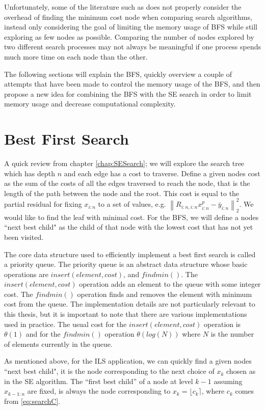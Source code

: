 \documentclass[12pt,Bold,letterpaper]{mcgilletdclass}
\begin{document}
Unfortunately, some of the literature such as \cite{StuBF07} does not properly consider the overhead of finding the minimum cost node when comparing search algorithms, instead only considering the goal of limiting the memory usage of BFS while still exploring as few nodes as possible. Comparing the number of nodes explored by two different search processes may not always be meaningful if one process spends much more time on each node than the other.

The following sections will explain the BFS, quickly overview a couple of attempts that have been made to control the memory usage of the BFS, and then propose a new idea for combining the BFS with the SE search in order to limit memory usage and decrease computational complexity.

\section{Best First Search} \label{sec:BFS}

A quick review from chapter \ref{chap:SESearch}; we will explore the search tree which has depth $n$ and each edge has a cost to traverse. Define a given nodes cost as the sum of the costs of all the edges traversed to reach the node, that is the length of the path between the node and the root. This cost is equal to the partial residual for fixing $x_{i:n}$ to a set of values, e.g. $\left \| R_{i:n,i:n}x_{i:n}^p - \bar{y}_{i:n}\right \|_2^2$. We would like to find the leaf with minimal cost. For the BFS, we will define a nodes ``next best child" as the child of that node with the lowest cost that has not yet been visited.

The core data structure used to efficiently implement a best first search is called a priority queue. The priority queue is an abstract data structure whose basic operations are $insert(element,cost)$, and $findmin()$. The $insert(element,cost)$ operation adds an element to the queue with some integer cost. The $findmin()$ operation finds and removes the element with minimum cost from the queue. The implementation details are not particularly relevant to this thesis, but it is important to note that there are various implementations used in practice. The usual cost for the $insert(element,cost)$ operation is $\theta(1)$ and for the $findmin()$ operation $\theta(log(N))$ where $N$ is the number of elements currently in the queue.

As mentioned above, for the ILS application, we can quickly find a given nodes ``next best child", it is the node corresponding to the next choice of $x_k$ chosen as in the SE algorithm. The ``first best child'' of a node at level $k-1$ assuming $x_{k-1:n}$ are fixed, is always the node corresponding to $x_k = \lfloor c_k \rceil$, where $c_k$ comes from \eqref{eq:searchC}.
\end{document}
